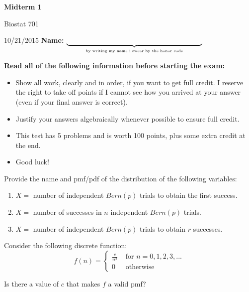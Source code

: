\documentclass{article}
\begin{document}

\centerline{\huge \bf Midterm 1}        %
\vfill \vfill
   
Biostat 701                               %

10/21/2015 \hfill                             %
{\bf Name: } $\underbrace{\hspace{2.7in}}_{\mbox{\tiny by writing my 
                                           name i swear by the honor code}}$
\vfill \vfill \vfill

{\bf Read all of the following information before starting the exam:}
\vspace{1pc}

\begin{itemize}                        %
	\item  Show all work, clearly and in order, if you want to get full
	credit.  I reserve the right to take off points if I cannot see how you 
	arrived at your answer (even if your final answer is correct).
	
	\item Justify your answers algebraically whenever possible to ensure 
	full credit. 
		
	\item  This test has 5 problems  %
	and is worth 100 points,           %
	plus some extra credit at the end. 
	
	\item  Good luck!
\end{itemize}

\vfill \vfill \vfill

\clearpage


\begin{problem}{3}
Provide the name and pmf/pdf of the distribution of the following variables:
\begin{enumerate}
\item $X = $ number of independent $Bern(p)$ trials to obtain the first success.
\item $X = $ number of successes in $n$ independent $Bern(p)$ trials.
\item $X = $ number of independent $Bern(p)$ trials to obtain $r$ successes.
\end{enumerate}
\end{problem}
\begin{problem}{5}
Consider the following discrete function:
$$f(n) = \left\{
\begin{matrix}
 \frac{c}{n^3}& \textrm{ for } n=0,1,2,3,...\\
  0 &\textrm{ otherwise }
\end{matrix}\right.$$

Is there a value of $c$ that makes $f$ a valid pmf?
\end{problem}
\end{document}

